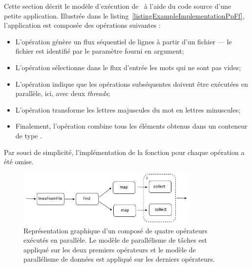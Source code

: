 Cette section d\'ecrit le mod\`ele d'ex\'ecution de \ppff\ \`a l'aide du code source d'une petite application. Illustr\'ee dans le listing~\ref{listingExampleImplementationPpFf}, l'application est compos\'ee des op\'erations suivantes :
\begin{itemize}
	\item L'opération  g\'en\`ere un flux séquentiel de lignes à partir d'un fichier --- le fichier est identifi\'e par le paramètre  fourni en argument;

	\item L'op\'eration  s\'electionne dans le flux d'entr\'ee les mots qui ne sont pas vides;

	\item L'op\'eration  indique que les op\'erations subs\'equentes doivent \^etre ex\'ecut\'ees en parall\`ele, ici, avec deux \emph{threads};
	
	\item L'op\'eration  transforme les lettres majuscules du mot en lettres minuscules;
	
	\item Finalement, l'op\'eration  combine tous les \'el\'ements obtenus dans un conteneur de type .
\end{itemize}

Par souci de simplicit\'e, l'impl\'ementation de la fonction pour chaque op\'eration a \'et\'e omise.
%


\begin{figure}[ht]
\centering
     \includegraphics[width=0.8\textwidth]{Figures/ExempleRuntimeExecution.jpg}
      \caption[Repr\'esentation graphique d'un  compos\'e de quatre op\'erateurs.]{Repr\'esentation graphique d'un  compos\'e de quatre op\'erateurs ex\'ecut\'es en parall\`ele. Le mod\`ele de parall\'elisme de t\^aches est appliqu\'e sur les deux premiers op\'erateurs et le mod\`ele de parall\'elisme de donn\'ees est appliqu\'e sur les derniers op\'erateurs.}
       \label{ExempleRuntimeExecution.fig}
\end{figure}


